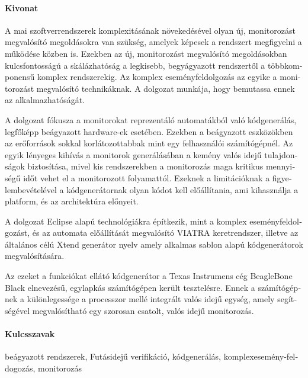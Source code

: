 \begin{otherlanguage}{magyar}
\paragraph*{Kivonat}
\thispagestyle{plain}

A mai szoftverrendszerek komplexitásának növekedésével olyan új, monitorozást megvalósító megoldásokra van szükség, amelyek képesek a rendszert megfigyelni  a működése közben is. Ezekben az új, monitorozást megvalósító megoldásokban kulcsfontosságú a skálázhatóság a legkisebb, begyágyazott rendszertől a többkomponensű komplex rendszerekig. Az komplex eseményfeldolgozás az egyike a monitorozást megvalósító technikáknak. A dolgozat munkája, hogy bemutassa ennek az alkalmazhatóságát.

A dolgozat fókusza a monitorokat reprezentáló automatákból való kódgenerálás, legfőképp beágyazott hardware-ek esetében. Ezekben a beágyazott eszközökben az erőforrások sokkal korlátozottabbak mint egy felhasználói számítógépnél. Az egyik lényeges kihívás a monitorok generálásában a kemény valós idejű tulajdonságok biztosítása, mivel kis rendszerekben a monitorozás maga kritikus mennyiségű időt vehet el a monitorozott folyamattól. Ezeknek a limitációknak a figyelembevételével a kódgenerátornak olyan kódot kell előállítania, ami kihasználja a platform, és az architektúra előnyeit.

A dolgozat Eclipse alapú technológiákra építkezik, mint a komplex eseményfeldolgozást, és az automata előállítását megvalósító VIATRA keretrendszer, illetve az általános célú Xtend generátor nyelv amely alkalmas sablon alapú kódgenerátorok megvalósítására.

Az ezeket a funkciókat ellátó kódgenerátor a Texas Instrumens cég BeagleBone Black elnevezésű, egylapkás számítógépen került tesztelésre. Ennek a számítógépnek a különlegessége a processzor mellé integrált valós idejű egység, amely segítségével megvalósítható egy szorosan csatolt, valós idejű monitorozás.

\paragraph{Kulcsszavak} beágyazott rendszerek, Futásidejű verifikáció, kódgenerálás, komplexesemény-feldogozás, monitorozás
\end{otherlanguage}

\cleardoublepage{}

